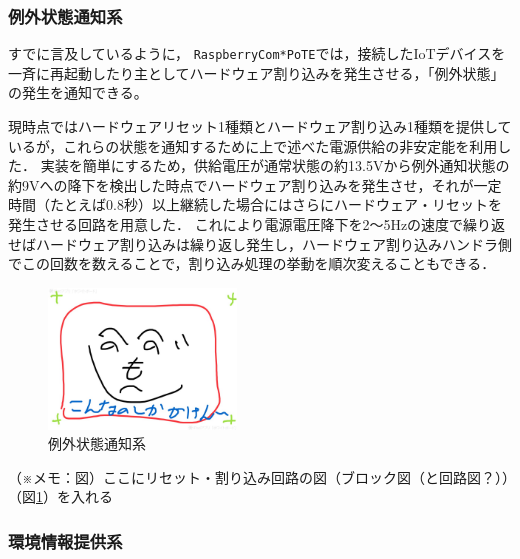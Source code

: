 \subsubsection{例外状態通知系}
\vspace{-0.5zh}


すでに言及しているように，
{\tt Raspberry\-Com*PoTE}では，接続したIoTデバイスを一斉に再起動したり主としてハードウェア割り込みを発生させる，「例外状態」の発生を通知できる。

現時点ではハードウェアリセット1種類とハードウェア割り込み1種類を提供しているが，これらの状態を通知するために上で述べた電源供給の非安定能を利用した．
実装を簡単にするため，供給電圧が通常状態の約13.5Vから例外通知状態の約9Vへの降下を検出した時点でハードウェア割り込みを発生させ，それが一定時間（たとえば0.8秒）以上継続した場合にはさらにハードウェア・リセットを発生させる回路を用意した．
これにより電源電圧降下を2〜5Hzの速度で繰り返せばハードウェア割り込みは繰り返し発生し，ハードウェア割り込みハンドラ側でこの回数を数えることで，割り込み処理の挙動を順次変えることもできる．

\vspace{-1zh}
\begin{figure}[H]
\centering
\includegraphics[width=5cm]{figspics/henoheno.jpeg}
\caption{例外状態通知系}
\label{hohno:RaspberryComPoTE-E}
\end{figure}
\vspace{-1zh}

（※メモ：図）ここにリセット・割り込み回路の図（ブロック図（と回路図？））（図\ref{hohno:RaspberryComPoTE-E}）を入れる



\subsubsection{環境情報提供系}
\vspace{-0.5zh}


